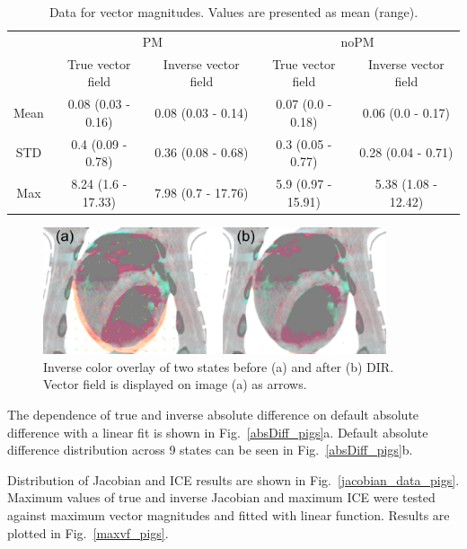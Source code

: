 \documentclass[type=dr, dr=rernat, accentcolor=tud7b,colorbacktitle, bigchapter, openright, twoside, 12pt ]{tudthesis}
\begin{document}
\begin{table}[H]
  \centering
  \caption{Data for vector magnitudes. Values are presented as mean (range).}
  \begin{tabular}{c|c|c|c|c}
	    & \multicolumn{2}{|c|}{PM} & \multicolumn{2}{|c}{noPM} \\
  
            & True vector field   & Inverse vector field   & True vector field  & Inverse vector field \\
       \hline
	Mean & 0.08 (0.03 - 0.16) & 0.08 (0.03 - 0.14) & 0.07 (0.0 - 0.18)  & 0.06 (0.0 - 0.17) \\ 
	STD  & 0.4 (0.09 - 0.78)  & 0.36 (0.08 - 0.68) & 0.3 (0.05 - 0.77)  & 0.28 (0.04 - 0.71) \\ 
	Max  & 8.24 (1.6 - 17.33) & 7.98 (0.7 - 17.76) & 5.9 (0.97 - 15.91) & 5.38 (1.08 - 12.42) \\ 
    \hline\hline
  \end{tabular}
  \label{tab:vectordata_pig}
\end{table}

\begin{figure}[H]
	\begin{center}		
		\includegraphics[width=0.9\textwidth]{./Images/exampleReg_pigs.png}
		\caption{Inverse color overlay of two states before (a) and after (b) DIR. Vector field is displayed on image (a) as arrows.}
		\label{exampleReg_pigs}
	\end{center}
\end{figure}

The dependence of true and inverse absolute difference on default absolute difference with a linear fit is shown in Fig.~\ref{absDiff_pigs}a. 
Default absolute difference distribution across 9 states can be seen in Fig.~\ref{absDiff_pigs}b.

Distribution of Jacobian and ICE results are shown in Fig.~\ref{jacobian_data_pigs}. Maximum values of true and inverse Jacobian and maximum ICE were
tested against maximum vector magnitudes and fitted with linear function. Results are plotted in Fig.~\ref{maxvf_pigs}.
\end{document}
